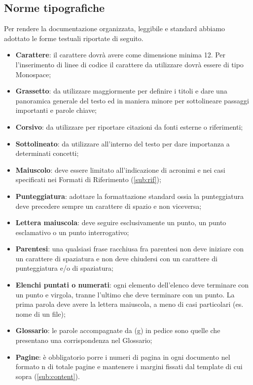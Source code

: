 {		\subsection{Norme tipografiche}{
			\label{sub:typo}
			Per rendere la documentazione organizzata, leggibile e standard abbiamo adottato le forme testuali riportate di seguito.
			\begin{itemize}
				\item \textbf{Carattere}: il carattere dovrà avere come dimensione minima 12. Per l'inserimento di linee di codice il carattere da utilizzare dovrà essere di tipo Monospace;
				\item \textbf{Grassetto}: da utilizzare maggiormente per definire i titoli e dare una panoramica generale del testo ed in maniera minore per sottolineare passaggi importanti e parole chiave;
				\item \textbf{Corsivo}: da utilizzare per riportare citazioni da fonti esterne o riferimenti;
				\item \textbf{Sottolineato}: da utilizzare all'interno del testo per dare importanza a determinati concetti;
				\item \textbf{Maiuscolo}: deve essere limitato all’indicazione di acronimi e nei casi specificati nei Formati di Riferimento (\ref{sub:rif});
				\item \textbf{Punteggiatura}: adottare la formattazione standard ossia la punteggiatura deve precedere sempre un carattere di spazio e non viceversa;
				\item \textbf{Lettera maiuscola}: deve seguire esclusivamente un punto, un punto esclamativo o un punto interrogativo;
				\item \textbf{Parentesi}: una qualsiasi frase racchiusa fra parentesi non deve iniziare con un carattere di spaziatura e non deve chiudersi con un carattere di punteggiatura e/o di spaziatura;
				\item \textbf{Elenchi puntati o numerati}: ogni elemento dell’elenco deve terminare con un punto e virgola, tranne l’ultimo che deve terminare con un punto. La prima parola deve avere la lettera maiuscola, a meno di casi particolari (es. nome di un file);
				\item \textbf{Glossario}: le parole accompagnate da (g) in pedice sono quelle che presentano una corrispondenza nel Glossario;
				\item \textbf{Pagine}: è obbligatorio porre i numeri di pagina in ogni documento nel formato {n} di {totale pagine} e mantenere i margini fissati dal template di cui sopra (\ref{sub:content}).
			\end{itemize}
		}
}

